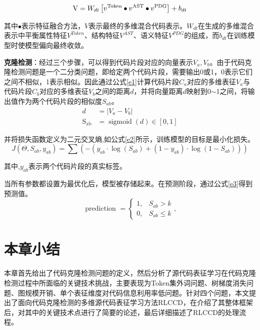 \begin{equation}\label{e4}
    \setlength{\abovedisplayskip}{1pt}
    \mathrm{V}=W_{dt}\left[v^{\text{Token}} \bullet v^{\text{AST}} \bullet v^{\text{PDG}}\right]+b_{dt}
\end{equation}

其中$\bullet$表示特征融合方法，$V$表示最终的多维混合代码表示。$W_{dt}$在生成的多维混合表示中平衡属性特征$V^{Token}$、结构特征$V^{AST}$、语义特征$V^{PDG}$的组成，而$b_{dt}$在训练模型时使模型偏向最终收敛。

\textbf{克隆检测}：经过三个步骤，可以得到代码片段对应的向量表示$V_{a},V_{b}$。由于代码克隆检测问题是一个二分类问题，即给定两个代码片段，需要输出0或1，0表示它们之间不相似，1表示相似。因此通过公式\ref{e1}计算代码片段$C_{a}$对应的多维表征$V_{a}$与代码片段$C_{b}$对应的多维表征$V_{b}$之间的距离$d$，并将向量距离$d$映射到0$\sim$1之间，将输出值作为两个代码片段的相似度$S_{ab}$。
\begin{equation}\label{e1}
    \begin{split}
    d &= \left|V_{a}-V_{b}\right| \\
    \mathrm{S_{ab}} &=\operatorname{sigmoid}\left(d\right) \in[0,1]
    \end{split}
\end{equation}

并将损失函数定义为二元交叉熵,如公式\ref{e2}所示，训练模型的目标是最小化损失。
\begin{equation}\label{e2}
    J(\Theta, S_{ab}, y_{ab})=\sum(-(y_{ab} \cdot \log (S_{ab})+(1-y_{ab}) \cdot \log (1-S_{ab})))
\end{equation}

其中,$y_{ab}$表示两个代码片段的真实标签。

当所有参数都设置为最优化后，模型被存储起来。在预测阶段，通过公式\ref{e3}得到预测值。
\begin{equation}\label{e3}
    \text { prediction }=\left\{\begin{array}{ll}
        1, & S_{ab}>k \\
        0, & S_{ab} \leq k
        \end{array},\right.
\end{equation}

\section{本章小结}
\label{sec:Summary2}
本章首先给出了代码克隆检测问题的定义，然后分析了源代码表征学习在代码克隆检测过程中所面临的关键技术挑战，主要表现为Token集外词问题、树梯度消失问题、图规模开销、单个表征维度对代码信息利用率低问题。针对四个问题，本文提出了面向代码克隆检测的多维源代码表征学习方法RLCCD，在介绍了其整体框架后，对其中的关键技术点进行了简要的论述，最后详细描述了RLCCD的处理流程。
